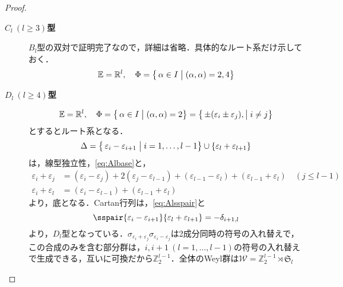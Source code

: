 \documentclass[rep_main]{subfiles}
\begin{document}
\begin{proof}
\begin{description}
		\item[\textbf{$C_l\ (l \geq 3)$型}] $B_l$型の双対で証明完了なので，詳細は省略．具体的なルート系だけ示しておく．
		\begin{equation}
			\mathbb{E} = \mathbb{R}^l,\quad  \Phi = \bigl\{\, \alpha \in I \bigm| (\alpha, \alpha) = 2, 4\bigr\}
		\end{equation}
		
		\item[\textbf{$D_l\ (l \geq 4)$型}] 
		\begin{equation}
			\mathbb{E} = \mathbb{R}^l,\quad  \Phi = \bigl\{\, \alpha \in I \bigm| (\alpha, \alpha) = 2\bigr\} = \bigl\{\, \pm(\varepsilon_i \pm \varepsilon_j), \bigm| i \neq j\bigr\}
		\end{equation}
		とするとルート系となる．
		\begin{equation}
			\Delta = \bigl\{\, \varepsilon_i - \varepsilon_{i+1} \bigm| i = 1, \ldots, l-1\bigr\} \cup \{\varepsilon_l + \varepsilon_{l+1}\}
		\end{equation}	
		は，線型独立性，\eqref{eq:Albase}と，
		\begin{align}
			\varepsilon_i + \varepsilon_j &= (\varepsilon_i - \varepsilon_j) + 2(\varepsilon_j - \varepsilon_{l-1}) + (\varepsilon_{l-1} - \varepsilon_l) + (\varepsilon_{l-1} + \varepsilon_l)\quad  (j \leq l-1) \\
			\varepsilon_i + \varepsilon_l &= (\varepsilon_i - \varepsilon_{l-1}) + (\varepsilon_{l-1} + \varepsilon_l)
		\end{align}
		より，底となる．Cartan行列は，\eqref{eq:Alsspair}と
		\begin{equation}
			\label{eq:Dlsspair}
			\sspair{\varepsilon_i - \varepsilon_{i+1}}{\varepsilon_l + \varepsilon_{l+1}} = -\delta_{i+1,l}
		\end{equation}
		より，$D_l$型となっている．$\sigma_{\varepsilon_i + \varepsilon_j}\sigma_{\varepsilon_i - \varepsilon_j}$は2成分同時の符号の入れ替えで，この合成のみを含む部分群は，$i, i+1\ (l = 1, \ldots, l-1)$の符号の入れ替えで生成できる，互いに可換だから$\mathbb{Z}_2^{l-1}$．全体のWeyl群は$\mathscr{W} = \mathbb{Z}_2^{l-1} \rtimes \mathfrak{S}_l$
		

\end{description}
\end{proof}
\end{document}
